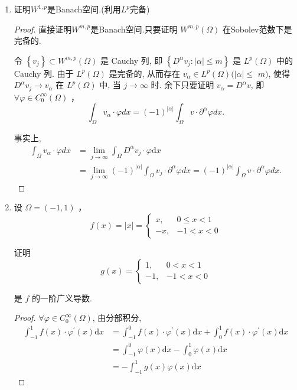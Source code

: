 \documentclass[12pt,a4paper]{article}
\begin{document}
\begin{enumerate}
\begin{proof}
		\end{proof}
		
		\item 证明$W^{1,p}$是Banach空间.(利用$L^p$完备)
		
		\begin{proof}
			
			直接证明$W^{m,p}$是Banach空间.只要证明 $W^{m, p}(\Omega)$ 在Sobolev范数下是完备的.
			
			令 $\left\{v_j\right\} \subset W^{m, p}(\Omega)$ 是 Cauchy 列, 即 $\left\{D^\alpha v_j:|\alpha| \leq m\right\}$ 是 $L^p(\Omega)$ 中的 Cauchy 列. 由于 $L^p(\Omega)$ 是完备的, 从而存在 $v_\alpha \in L^p(\Omega)(|\alpha| \leq$ $m)$, 使得 $D^\alpha v_j \rightarrow v_\alpha$ 在 $L^p(\Omega)$ 中, 当 $j \rightarrow \infty$ 时. 余下只要证明 $v_\alpha=D^\alpha v$, 即 $\forall \varphi \in C_0^{\infty}(\Omega)$ ，
			$$
			\int_{\Omega} v_\alpha \cdot \varphi d x=(-1)^{|\alpha|} \int_{\Omega} v \cdot \partial^\alpha \varphi d x .
			$$
			
			事实上,
			$$
			\begin{aligned}
				\int_{\Omega} v_\alpha \cdot \varphi d x & =\lim _{j \rightarrow \infty} \int_{\Omega} D^\alpha v_j \cdot \varphi \mathrm{d} x \\
				& =\lim _{j \rightarrow \infty}(-1)^{|\alpha|} \int_{\Omega} v_j \cdot \partial^\alpha \varphi d x=(-1)^{|\alpha|} \int_{\Omega} v \cdot \partial^\alpha \varphi d x.
			\end{aligned}
			$$
		\end{proof}
		
		\item 设 $\Omega=(-1,1)$ ，
		$$
		f(x)=|x|= \begin{cases}x, & 0 \leq x<1 \\ -x, & -1<x<0\end{cases}
		$$
		
		证明
		$$
		g(x)= \begin{cases}1, & 0<x<1 \\ -1, & -1<x<0\end{cases}
		$$
		
		是 $f$ 的一阶广义导数.
		
		\begin{proof}
			$\forall \varphi \in C_0^{\infty}(\Omega)$, 由分部积分,
			$$
			\begin{aligned}
				\int_{-1}^1 f(x) \cdot \varphi^{\prime}(x) \mathrm{d} x & =\int_{-1}^0 f(x) \cdot \varphi^{\prime}(x) \mathrm{d} x+\int_0^1 f(x) \cdot \varphi^{\prime}(x) \mathrm{d} x \\
				& =\int_{-1}^0 \varphi(x) \mathrm{d} x-\int_0^1 \varphi(x) \mathrm{d} x \\
				& =-\int_{-1}^1 g(x) \varphi(x) \mathrm{d} x
			\end{aligned}
			$$
			

\end{proof}
\end{enumerate}
\end{document}
